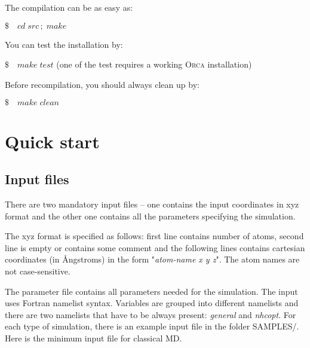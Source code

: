 \documentclass[12pt,a4paper]{article}
\begin{document}
\noindent
The compilation can be as easy as: 

\medskip
\colorbox{black!20}{$ \$ \quad cd\; src\,; \; make$}

\bigskip\noindent
You can test the installation by:

\medskip
\colorbox{black!20}{$ \$ \quad make \; test$}  (one of the test requires a working \textsc{Orca} installation)

\medskip\noindent
Before recompilation, you should always clean up by:

\medskip
\colorbox{black!20}{$ \$ \quad make \; clean$}

\section{Quick start}
\subsection{Input files}

There are two mandatory input files -- one contains the input coordinates in xyz format and the other one contains all the parameters specifying the simulation.

The xyz format is specified as follows: 
first line contains number of atoms, second line is empty or contains some comment and the following lines contains cartesian coordinates (in \AA ngstroms) in the form "\textit{atom-name	x y z}". The atom names are not case-sensitive.

The parameter file contains all parameters needed for the simulation.
The input uses Fortran namelist syntax.
Variables are grouped into different namelists and there are two namelists that have to be always present: \textit{general} and \textit{nhcopt}. For each type of simulation, there is an example input file in
the folder SAMPLES/. Here is the minimum input file for classical MD.
\end{document}
